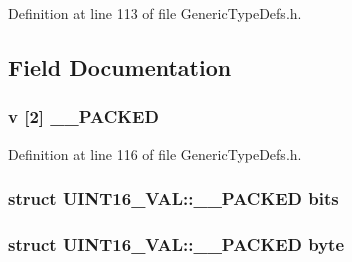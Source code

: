 Definition at line 113 of file Generic\+Type\+Defs.\+h.



\subsection{Field Documentation}
\hypertarget{union_u_i_n_t16___v_a_l_a7a1d2ea534b2031c6444c696032bd369}{}
\subsubsection[{\+\_\+\+\_\+\+P\+A\+C\+K\+E\+D}]{ {\bf v} \mbox{[}2\mbox{]} {\bf \+\_\+\+\_\+\+P\+A\+C\+K\+E\+D}}\label{union_u_i_n_t16___v_a_l_a7a1d2ea534b2031c6444c696032bd369}


Definition at line 116 of file Generic\+Type\+Defs.\+h.

\hypertarget{union_u_i_n_t16___v_a_l_a075e0bdd9e1be60d2738b18a0e17c595}{}
\subsubsection[{bits}]{\setlength{\rightskip}{0pt plus 5cm}struct {\bf U\+I\+N\+T16\+\_\+\+V\+A\+L\+::\+\_\+\+\_\+\+P\+A\+C\+K\+E\+D}  bits}\label{union_u_i_n_t16___v_a_l_a075e0bdd9e1be60d2738b18a0e17c595}
\hypertarget{union_u_i_n_t16___v_a_l_a5ef231687e0ec94aa497e688ce7fecbc}{}
\subsubsection[{byte}]{\setlength{\rightskip}{0pt plus 5cm}struct {\bf U\+I\+N\+T16\+\_\+\+V\+A\+L\+::\+\_\+\+\_\+\+P\+A\+C\+K\+E\+D}  byte}\label{union_u_i_n_t16___v_a_l_a5ef231687e0ec94aa497e688ce7fecbc}
\hypertarget{union_u_i_n_t16___v_a_l_a39422387a9d2651da86ce4437ee8b5ab}{}
